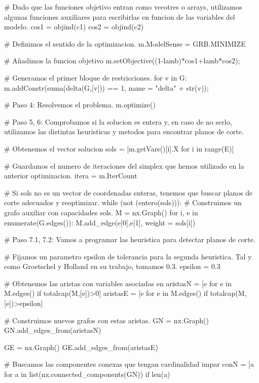 \documentclass[twoside,a4paper,openright,12pt]{book}
\begin{document}
\begin{pythone}
    # Dado que las funciones objetivo entran como vecotres o arrays, utilizamos algunas funciones auxiliares para escribirlas en funcion de las variables del modelo.      
    cos1 = objind(c1)
    cos2 = objind(c2)
    
    # Definimos el sentido de la optimizacion.
    m.ModelSense = GRB.MINIMIZE
    
    # Añadimos la funcion objetivo
    m.setObjective((1-lamb)*cos1+lamb*cos2); 
    
    # Generamos el primer bloque de restricciones.
    for v in G:
        m.addConstr(suma(delta(G,[v])) == 1, name = "delta" + str(v));
    
    # Paso 4: Resolvemos el problema.
    m.optimize()
    
    # Paso 5, 6: Comprobamos si la solucion es entera y, en caso de no serlo, utilizamos las distintas heuristicas y metodos para encontrar planos de corte.
        
    # Obtenemos el vector solucion
    sols = [m.getVars()[i].X for i in range(E)]
    
    # Guardamos el numero de iteraciones del simplex que hemos utilizado en la anterior optimizacion.
    itera = m.IterCount
    
   	# Si sols no es un vector de coordenadas enteras, tenemos que buscar planos de corte adecuados y reoptimizar.
    while (not (entero(sols))):     
        # Construimos un grafo auxiliar con capacidades sols.
        M = nx.Graph()
        for i, e in enumerate(G.edges()):
            M.add_edge(e[0],e[1], weight = sols[i])
        
        # Paso 7.1, 7.2: Vamos a programar las heuristica para detectar planos de corte.
        
        # Fijamos un parametro epsilon de tolerancia para la segunda heuristica. Tal y como Groetschel y Holland en su trabajo, tomamos 0.3. 
        epsilon = 0.3 
        
        # Obtenemos las aristas con variables asociadas en
        aristasN = [e for e in M.edges() if totalcap(M,[e])>0]
        aristasE = [e for e in M.edges() if totalcap(M,[e])>epsilon]
            
        # Construimos nuevos grafos con estas aristas.
        GN = nx.Graph()
        GN.add_edges_from(aristasN)
        
        GE = nx.Graph()
        GE.add_edges_from(aristasE)
        
        # Buscamos las componentes conexas que tengan cardinalidad impar
        conN = [a for a in list(nx.connected_components(GN)) if len(a) %
        

\end{pythone}
\end{document}
